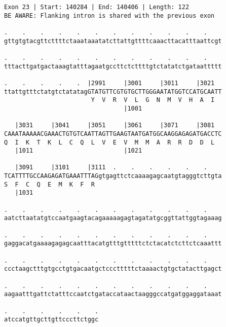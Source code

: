 \documentclass{article}
\begin{document}
\begin{Verbatim}
Exon 23 | Start: 140284 | End: 140406 | Length: 122
BE AWARE: Flanking intron is shared with the previous exon
 
.    .    .    .    .    .    .    .    .    .    .    .    
gttgtgtacgttcttttctaaataaatatcttattgttttcaaacttacatttaattcgt
  
.    .    .    .    .    .    .    .    .    .    .    .    
tttacttgatgactaaagtatttagaatgccttctcttttgtctatatctgataattttt
  
.    .    .    .    .  |2991     |3001     |3011     |3021  
ttattgtttctatgtctatatagGTATGTTCGTGTGCTTGGGAATATGGTCCATGCAATT
                        Y  V  R  V  L  G  N  M  V  H  A  I  
                                 |1001                      
  
   |3031     |3041     |3051     |3061     |3071     |3081  
CAAATAAAAACGAAACTGTGTCAATTAGTTGAAGTAATGATGGCAAGGAGAGATGACCTC
Q  I  K  T  K  L  C  Q  L  V  E  V  M  M  A  R  R  D  D  L  
   |1011                         |1021                      
  
   |3091     |3101     |3111  .    .    .    .    .    .    
TCATTTTGCCAAGAGATGAAATTTAGgtgagttctcaaaagagcaatgtagggtcttgta
S  F  C  Q  E  M  K  F  R                                   
   |1031                                                    
  
.    .    .    .    .    .    .    .    .    .    .    .    
aatcttaatatgtccaatgaagtacagaaaaagagtagatatgcggttattggtagaaag
  
.    .    .    .    .    .    .    .    .    .    .    .    
gaggacatgaaaagagagcaatttacatgtttgtttttctctacatctcttctcaaattt
  
.    .    .    .    .    .    .    .    .    .    .    .    
ccctaagctttgtgcctgtgacaatgctccctttttctaaaactgtgctatacttgagct
  
.    .    .    .    .    .    .    .    .    .    .    .    
aagaatttgattctatttccaatctgataccataactaagggccatgatggaggataaat
  
.    .    .    .    .    .
atccatgttgcttgttcccttctggc
\end{Verbatim}
\newpage
\end{document}
